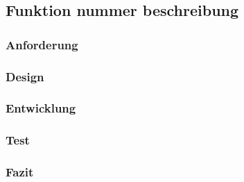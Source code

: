 \subsection[Funktion nummmer kurzbeschreibung]{Funktion nummer beschreibung}

\subsubsection{Anforderung}

\subsubsection{Design}

\subsubsection{Entwicklung}

\subsubsection{Test}

\subsubsection{Fazit}